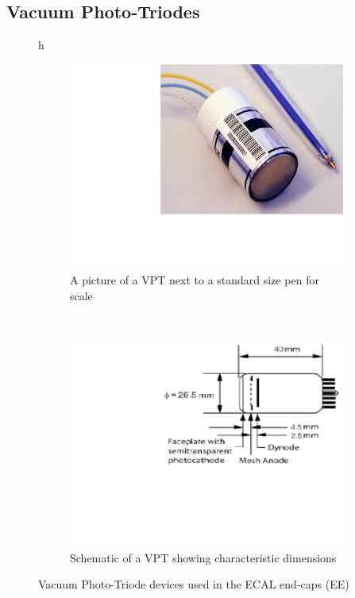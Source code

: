 \subsection{Vacuum Photo-Triodes}
\label{vpt_description}

\begin{figure}{h}
    \centering
    \begin{subfigure}[h]{0.450\textwidth}
        \includegraphics[width=\textwidth]{Figures/CMS_Diagrams/ECAL__VPT.pdf}
        \caption{A picture of a VPT next to a standard size pen for scale}\label{fig:ecal_vpt_pic}
      \end{subfigure}
      ~ %
    \begin{subfigure}[h]{0.450\textwidth}
        \includegraphics[width=\textwidth]{Figures/CMS_Diagrams/ECAL__VPT_schematic.pdf}
        \caption{Schematic of a VPT showing characteristic dimensions}\label{fig:ecal_vpt_schematic}
      \end{subfigure}
      \caption{Vacuum Photo-Triode devices used in the ECAL end-caps (EE)}\label{fig:ecal_vpt}
\end{figure}

